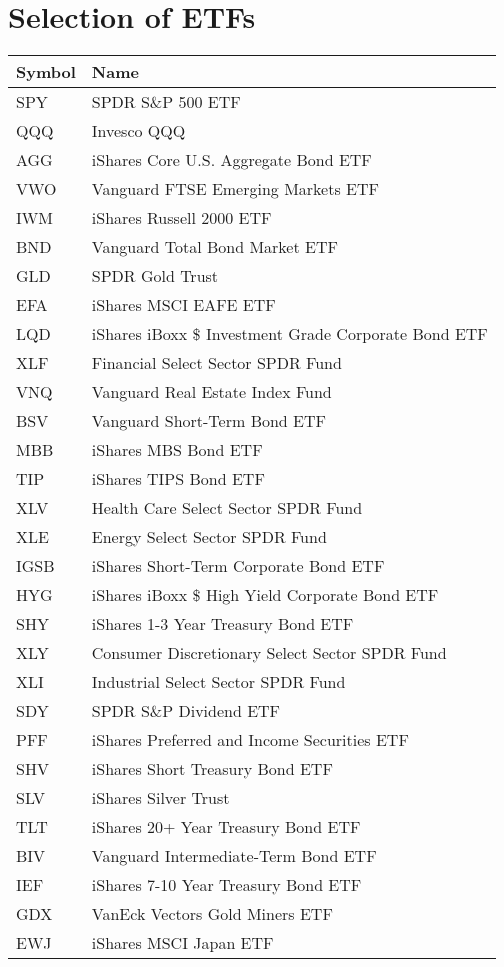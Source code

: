 \chapter{Selection of ETFs}
\label{appendix:etfs}
\par
\begin{longtable}{|| m{2cm}| m{11.5cm}||}
\hline
Symbol & Name  \\ \hline \hline
SPY & SPDR S\&P 500 ETF \\ \hline
QQQ & Invesco QQQ \\ \hline
AGG & iShares Core U.S. Aggregate Bond ETF \\ \hline
VWO & Vanguard FTSE Emerging Markets ETF \\ \hline
IWM & iShares Russell 2000 ETF \\ \hline
BND & Vanguard Total Bond Market ETF \\ \hline
GLD & SPDR Gold Trust \\ \hline
EFA & iShares MSCI EAFE ETF \\ \hline
LQD & iShares iBoxx \$ Investment Grade Corporate Bond ETF \\ \hline
XLF & Financial Select Sector SPDR Fund \\ \hline
VNQ & Vanguard Real Estate Index Fund \\ \hline
BSV & Vanguard Short-Term Bond ETF \\ \hline
MBB & iShares MBS Bond ETF \\ \hline
TIP & iShares TIPS Bond ETF \\ \hline
XLV & Health Care Select Sector SPDR Fund \\ \hline
XLE & Energy Select Sector SPDR Fund \\ \hline
IGSB & iShares Short-Term Corporate Bond ETF \\ \hline
HYG & iShares iBoxx \$ High Yield Corporate Bond ETF \\ \hline
SHY & iShares 1-3 Year Treasury Bond ETF \\ \hline
XLY & Consumer Discretionary Select Sector SPDR Fund \\ \hline
XLI & Industrial Select Sector SPDR Fund \\ \hline
SDY & SPDR S\&P Dividend ETF \\ \hline
PFF & iShares Preferred and Income Securities ETF \\ \hline
SHV & iShares Short Treasury Bond ETF \\ \hline
SLV & iShares Silver Trust \\ \hline
TLT & iShares 20+ Year Treasury Bond ETF \\ \hline
BIV & Vanguard Intermediate-Term Bond ETF \\ \hline
IEF & iShares 7-10 Year Treasury Bond ETF \\ \hline
GDX & VanEck Vectors Gold Miners ETF \\ \hline
EWJ & iShares MSCI Japan ETF \\ \hline \hline


  
\end{longtable}
